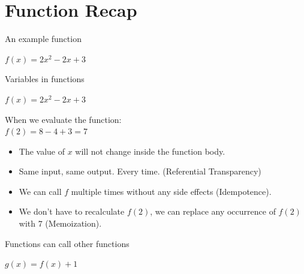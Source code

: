 \documentclass[mathserif]{beamer}
\begin{document}
\section{Function Recap}

\begin{frame}{An example function}

  {\Huge $f(x) = 2x^2 - 2x + 3$}


\end{frame}

\begin{frame}{Variables in functions}

  {\Huge $f(x) = 2x^2 - 2x + 3$}

  \vskip5mm

When we evaluate the function:\\
$f(2) = 8 - 4 + 3 = 7$

  \begin{itemize}[<+->]
    \item The value of $x$ will not change inside the function body.
    \item Same input, same output. Every time. (Referential Transparency)
    \item We can call $f$ multiple times without any side effects (Idempotence).
    \item We don't have to recalculate $f(2)$, we can replace any
      occurrence of $f(2)$ with $7$ (Memoization).
  \end{itemize}
\end{frame}


\begin{frame}{Functions can call other functions}

  {\Huge $g(x) = f(x) + 1$}

\end{frame}
\end{document}
